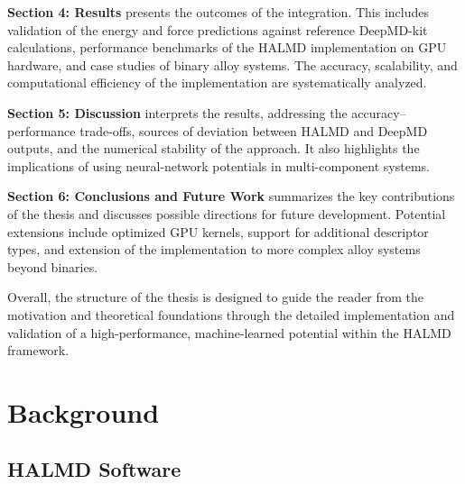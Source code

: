 \documentclass[a4paper,11pt,oneside]{article}
\begin{document}
\textbf{Section 4: Results} presents the outcomes of the integration. This includes validation of the energy and force predictions against reference DeepMD-kit calculations, performance benchmarks of the HALMD implementation on GPU hardware, and case studies of binary alloy systems. The accuracy, scalability, and computational efficiency of the implementation are systematically analyzed.

\textbf{Section 5: Discussion} interprets the results, addressing the accuracy–performance trade-offs, sources of deviation between HALMD and DeepMD outputs, and the numerical stability of the approach. It also highlights the implications of using neural-network potentials in multi-component systems.

\textbf{Section 6: Conclusions and Future Work} summarizes the key contributions of the thesis and discusses possible directions for future development. Potential extensions include optimized GPU kernels, support for additional descriptor types, and extension of the implementation to more complex alloy systems beyond binaries.

Overall, the structure of the thesis is designed to guide the reader from the motivation and theoretical foundations through the detailed implementation and validation of a high-performance, machine-learned potential within the HALMD framework.


\section{Background}
\subsection{HALMD Software}


\end{document}
